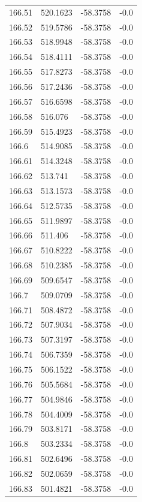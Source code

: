 \begin{table}[H]
\begin{tabular}{llll}
166.51 & 520.1623 & -58.3758 & -0.0 \\
166.52 & 519.5786 & -58.3758 & -0.0 \\
166.53 & 518.9948 & -58.3758 & -0.0 \\
166.54 & 518.4111 & -58.3758 & -0.0 \\
166.55 & 517.8273 & -58.3758 & -0.0 \\
166.56 & 517.2436 & -58.3758 & -0.0 \\
166.57 & 516.6598 & -58.3758 & -0.0 \\
166.58 & 516.076 & -58.3758 & -0.0 \\
166.59 & 515.4923 & -58.3758 & -0.0 \\
166.6 & 514.9085 & -58.3758 & -0.0 \\
166.61 & 514.3248 & -58.3758 & -0.0 \\
166.62 & 513.741 & -58.3758 & -0.0 \\
166.63 & 513.1573 & -58.3758 & -0.0 \\
166.64 & 512.5735 & -58.3758 & -0.0 \\
166.65 & 511.9897 & -58.3758 & -0.0 \\
166.66 & 511.406 & -58.3758 & -0.0 \\
166.67 & 510.8222 & -58.3758 & -0.0 \\
166.68 & 510.2385 & -58.3758 & -0.0 \\
166.69 & 509.6547 & -58.3758 & -0.0 \\
166.7 & 509.0709 & -58.3758 & -0.0 \\
166.71 & 508.4872 & -58.3758 & -0.0 \\
166.72 & 507.9034 & -58.3758 & -0.0 \\
166.73 & 507.3197 & -58.3758 & -0.0 \\
166.74 & 506.7359 & -58.3758 & -0.0 \\
166.75 & 506.1522 & -58.3758 & -0.0 \\
166.76 & 505.5684 & -58.3758 & -0.0 \\
166.77 & 504.9846 & -58.3758 & -0.0 \\
166.78 & 504.4009 & -58.3758 & -0.0 \\
166.79 & 503.8171 & -58.3758 & -0.0 \\
166.8 & 503.2334 & -58.3758 & -0.0 \\
166.81 & 502.6496 & -58.3758 & -0.0 \\
166.82 & 502.0659 & -58.3758 & -0.0 \\
166.83 & 501.4821 & -58.3758 & -0.0 \\

\end{tabular}
\end{table}
